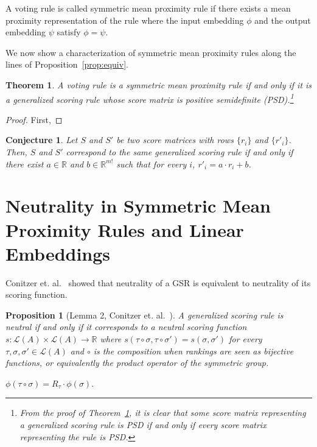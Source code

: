 \documentclass[10pt,letterpaper]{article}
\newcommand{\calL}{{\mathcal{L}}}
\newcommand{\rank}{{\calL(A)}}
\newtheorem{theorem}{Theorem}
\newtheorem{conjecture}{Conjecture}
\newtheorem{proposition}{Proposition}
\newenvironment{definition}[1][Definition]{\begin{trivlist}
\item[\hskip \labelsep {\bfseries #1}]}{\end{trivlist}}
\begin{document}
\begin{definition}[Symmetric Mean Proximity Rules]
A voting rule is called symmetric mean proximity rule if there exists a mean proximity representation of the rule where the input embedding $\phi$ and the output embedding $\psi$ satisfy $\phi = \psi$. 
\end{definition} 

We now show a characterization of symmetric mean proximity rules along the lines of Proposition~\ref{prop:equiv}. 
\begin{theorem}
A voting rule is a symmetric mean proximity rule if and only if it is a generalized scoring rule whose score matrix is positive semidefinite (PSD).\footnote{From the proof of Theorem~\ref{thm:symm}, it is clear that some score matrix representing a generalized scoring rule is PSD if and only if every score matrix representing the rule is PSD.}
\label{thm:symm}
\end{theorem}
\begin{proof}
First, 
\end{proof}

\begin{conjecture}
Let $S$ and $S'$ be two score matrices with rows $\{r_i\}$ and $\{r'_i\}$. Then, $S$ and $S'$ correspond to the same generalized scoring rule if and only if there exist $a \in \mathbb{R}$ and $b \in \mathbb{R}^{m!}$ such that for every $i$, $r'_i = a \cdot r_i + b$. 
\end{conjecture}

\section{Neutrality in Symmetric Mean Proximity Rules and Linear Embeddings}

Conitzer et. al.~\cite{CRX09} showed that neutrality of a GSR is equivalent to neutrality of its scoring function.
\begin{proposition}[Lemma 2, Conitzer et. al.~\cite{CRX09}]
A generalized scoring rule is neutral if and only if it corresponds to a neutral scoring function $s : \rank \times \rank \rightarrow \mathbb{R}$ where $s(\tau \circ \sigma,\tau \circ \sigma') = s(\sigma,\sigma')$ for every $\tau, \sigma, \sigma' \in \rank$ and $\circ$ is the composition when rankings are seen as bijective functions, or equivalently the product operator of the symmetric group. 
\end{proposition}

\begin{definition}[Linear Embeddings]
$\phi(\tau \circ \sigma) = R_{\tau} \cdot \phi(\sigma)$. 
\end{definition}
\end{document}
